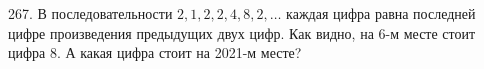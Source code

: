 267. В последовательности $2, 1, 2, 2, 4, 8, 2, \ldots$ каждая цифра равна последней цифре произведения предыдущих двух цифр. Как видно, на 6-м месте стоит цифра 8. А какая цифра стоит на 2021-м месте?\\
